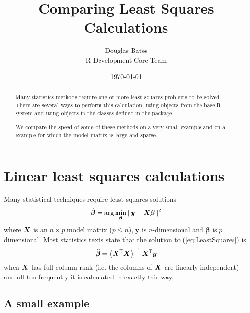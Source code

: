 \documentclass{article}
\begin{document}
\title{Comparing Least Squares Calculations}
\author{Douglas Bates\\R Development Core Team\\}
\date{\today}
\maketitle
\begin{abstract}
  Many statistics methods require one or more least squares problems
  to be solved.  There are several ways to perform this calculation,
  using objects from the base R system and using objects in the
  classes defined in the  package.

  We compare the speed of some of these methods on a very small
  example and on a example for which the model matrix is large and
  sparse.
\end{abstract}

\section{Linear least squares calculations}
\label{sec:LeastSquares}

Many statistical techniques require least squares solutions
\begin{equation}
  \label{eq:LeastSquares}
  \widehat{\bm{\beta}}=
  \arg\min_{\bm{\beta}}\left\|\bm{y}-\bm{X}\bm{\beta}\right\|^2
\end{equation}
where $\bm{X}$ is an $n\times p$ model matrix ($p\leq n$), $\bm{y}$ is
$n$-dimensional and $\bm{\beta}$ is $p$ dimensional.  Most statistics
texts state that the solution to (\ref{eq:LeastSquares}) is
\begin{equation}
  \label{eq:XPX}
  \widehat{\bm{\beta}}=\left(\bm{X}^\mathsf{T}\bm{X}\right)^{-1}\bm{X}^\mathsf{T}\bm{y}
\end{equation}
when $\bm{X}$ has full column rank (i.e. the columns of $\bm{X}$ are
linearly independent) and all too frequently it is calculated in
exactly this way.


\subsection{A small example}
\label{sec:smallLSQ}
\end{document}
